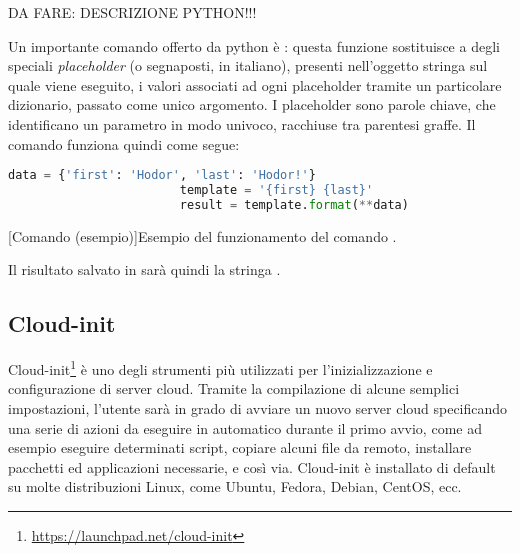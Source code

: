             DA FARE: DESCRIZIONE PYTHON!!!
        
            Un importante comando offerto da python è : questa funzione sostituisce a degli speciali \textit{placeholder} (o segnaposti, in italiano), presenti nell'oggetto stringa sul quale viene eseguito, i valori associati ad ogni placeholder tramite un particolare dizionario, passato come unico argomento. I placeholder sono parole chiave, che identificano un parametro in modo univoco, racchiuse tra parentesi graffe. Il comando  funziona quindi come segue:
            
            \begin{center}
                \begin{minipage}{\linewidth}
                    \begin{lstlisting}[language=python, gobble=22]
                        data = {'first': 'Hodor', 'last': 'Hodor!'}
                        template = '{first} {last}'
                        result = template.format(**data)
                    \end{lstlisting}
                    \captionsetup{textformat=empty,labelformat=empty} \vspace{-2em}
                    [Comando  (esempio)]{Esempio del funzionamento del comando .}
                \end{minipage}
            \end{center}
            
            Il risultato salvato in  sarà quindi la stringa .
        
        \subsection{Cloud-init} \label{subsec:p;sl;cloud-init}
        
            Cloud-init\footnote{\url{https://launchpad.net/cloud-init}} è uno degli strumenti più utilizzati per l'inizializzazione e configurazione di server cloud. Tramite la compilazione di alcune semplici impostazioni, l'utente sarà in grado di avviare un nuovo server cloud specificando una serie di azioni da eseguire in automatico durante il primo avvio, come ad esempio eseguire determinati script, copiare alcuni file da remoto, installare pacchetti ed applicazioni necessarie, e così via. Cloud-init è installato di default su molte distribuzioni Linux, come Ubuntu, Fedora, Debian, CentOS, ecc. \cite{cloud-init:readthedocs}
            
